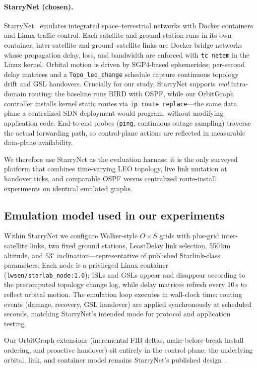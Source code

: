\paragraph{StarryNet (chosen).}
StarryNet~\cite{lai2023starrynet} emulates integrated space--terrestrial
networks with Docker containers and Linux traffic control.
Each satellite and ground station runs in its own container; inter-satellite
and ground--satellite links are Docker bridge networks whose propagation delay,
loss, and bandwidth are enforced with \texttt{tc netem} in the Linux kernel.
Orbital motion is driven by SGP4-based ephemerides; per-second delay matrices
and a \texttt{Topo\_leo\_change} schedule capture continuous topology drift
and GSL handovers.
Crucially for our study, StarryNet supports \emph{real} intra-domain routing:
the baseline runs BIRD with OSPF, while our OrbitGraph controller installs
kernel static routes via \texttt{ip route replace}---the same data plane a
centralized SDN deployment would program, without modifying application code.
End-to-end probes (\texttt{ping}, continuous outage sampling) traverse the
actual forwarding path, so control-plane actions are reflected in measurable
data-plane availability.

We therefore use StarryNet as the evaluation harness: it is the only surveyed
platform that combines time-varying LEO topology, live link mutation at
handover ticks, and comparable OSPF versus centralized route-install
experiments on identical emulated graphs.

\subsection{Emulation model used in our experiments}

Within StarryNet we configure Walker-style $O \times S$ grids with plus-grid
inter-satellite links, two fixed ground stations, LeastDelay link selection,
550\,km altitude, and 53$^\circ$ inclination---representative of published
Starlink-class parameters.
Each node is a privileged Linux container (\texttt{lwsen/starlab\_node:1.0});
ISLs and GSLs appear and disappear according to the precomputed topology
change log, while delay matrices refresh every 10\,s to reflect orbital motion.
The emulation loop executes in wall-clock time: routing events (damage,
recovery, GSL handover) are applied synchronously at scheduled seconds, matching
StarryNet's intended mode for protocol and application testing.

Our OrbitGraph extensions (incremental FIB deltas, make-before-break install
ordering, and proactive handover) sit entirely in the control plane; the
underlying orbital, link, and container model remains StarryNet's published
design~\cite{lai2023starrynet}.
